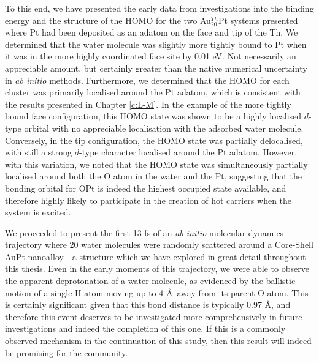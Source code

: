 To this end, we have presented the early data from investigations into the binding energy and the structure of the HOMO for the two Au$_{20}^{Th}$Pt systems presented where Pt had been deposited as an adatom on the face and tip of the Th. We determined that the water molecule was slightly more tightly bound to Pt when it was in the more highly coordinated face site by 0.01 eV. Not necessarily an appreciable amount, but certainly greater than the native numerical uncertainty in \textit{ab initio} methods. Furthermore, we determined that the HOMO for each cluster was primarily localised around the Pt adatom, which is consistent with the results presented in Chapter \ref{c:L-M}. In the example of the more tightly bound face configuration, this HOMO state was shown to be a highly localised $d$-type orbital with no appreciable localisation with the adsorbed water molecule. Conversely, in the tip configuration, the HOMO state was partially delocalised, with still a strong $d$-type character localised around the Pt adatom. However, with this variation, we noted that the HOMO state was simultaneously partially localised around both the O atom in the water and the Pt, suggesting that the bonding orbital for OPt is indeed the highest occupied state available, and therefore highly likely to participate in the creation of hot carriers when the system is excited.

We proceeded to present the first 13 fs of an \textit{ab initio} molecular dynamics trajectory where 20 water molecules were randomly scattered around a Core-Shell AuPt nanoalloy - a structure which we have explored in great detail throughout this thesis. Even in the early moments of this trajectory, we were able to observe the apparent deprotonation of a water molecule, as evidenced by the ballistic motion of a single H atom moving up to 4 \AA \ away from its parent O atom. This is certainly significant given that this bond distance is typically 0.97 \AA, and therefore this event deserves to be investigated more comprehensively in future investigations and indeed the completion of this one. If this is a commonly observed mechanism in the continuation of this study, then this result will indeed be promising for the community.